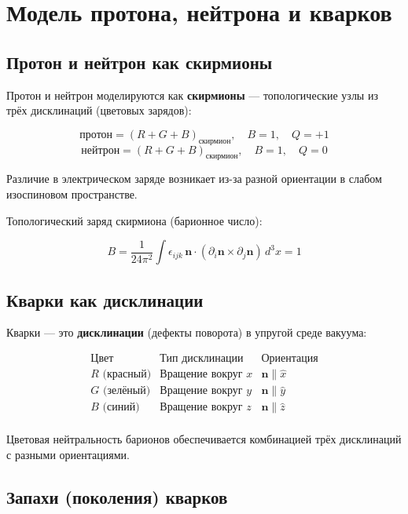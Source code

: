 \documentclass[12pt]{article}
\begin{document}
\section{Модель протона, нейтрона и кварков}

\subsection{Протон и нейтрон как скирмионы}

Протон и нейтрон моделируются как \textbf{скирмионы} — топологические узлы из трёх дисклинаций (цветовых зарядов):

\[
\text{протон} = (R + G + B)_{\text{скирмион}}, \quad B = 1, \quad Q = +1
\]
\[
\text{нейтрон} = (R + G + B)_{\text{скирмион}}, \quad B = 1, \quad Q = 0
\]

Различие в электрическом заряде возникает из-за разной ориентации в слабом изоспиновом пространстве.

Топологический заряд скирмиона (барионное число):

\[
B = \frac{1}{24\pi^2} \int \epsilon_{ijk} \, \mathbf{n} \cdot (\partial_i \mathbf{n} \times \partial_j \mathbf{n}) \, d^3x = 1
\]

\subsection{Кварки как дисклинации}

Кварки — это \textbf{дисклинации} (дефекты поворота) в упругой среде вакуума:

\[
\begin{array}{c|c|c}
\text{Цвет} & \text{Тип дисклинации} & \text{Ориентация} \\
\hline
R \text{ (красный)} & \text{Вращение вокруг } x & \mathbf{n} \parallel \hat{x} \\
G \text{ (зелёный)} & \text{Вращение вокруг } y & \mathbf{n} \parallel \hat{y} \\
B \text{ (синий)} & \text{Вращение вокруг } z & \mathbf{n} \parallel \hat{z} \\
\end{array}
\]

Цветовая нейтральность барионов обеспечивается комбинацией трёх дисклинаций с разными ориентациями.

\subsection{Запахи (поколения) кварков}
\end{document}
